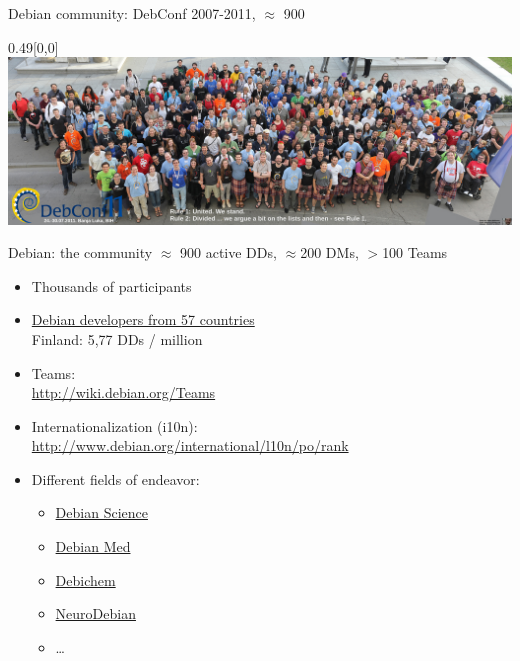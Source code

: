 \documentclass[]{beamer}
\begin{document}
\begin{frame}[t]{Debian community: DebConf 2007-2011, $\approx$ 900}
\begin{center}
\begin{textblock*}{0.49\linewidth}[0,0]
\includegraphics[width=\linewidth]{Dc11group_1024}
\end{textblock*}
\end{center}
\end{frame}


\begin{frame}[t]{Debian: the community}
$\approx$ 900 active \alert{DDs}, $\approx$200 \alert{DMs}, $>$100 Teams
\begin{itemize}
\item Thousands of participants
\item \href{http://www.perrier.eu.org/weblog/2011/06/12}{Debian developers from 57 countries}\\
  \alert{Finland: 5,77 DDs / million}
\item Teams:\\
  \url{http://wiki.debian.org/Teams}
\item Internationalization (i10n):\\
  \url{http://www.debian.org/international/l10n/po/rank}

\item Different fields of endeavor:
  \begin{itemize}
  \item \href{http://wiki.debian.org/DebianScience}{Debian Science}
  \item \href{http://www.debian.org/devel/debian-med/index.en.html}{Debian Med}
  \item \href{http://debichem.alioth.debian.org}{Debichem}
  \item \href{http://neuro.debian.net}{NeuroDebian}
  \item \ldots
  \end{itemize}
\end{itemize}
\end{frame}
\end{document}

